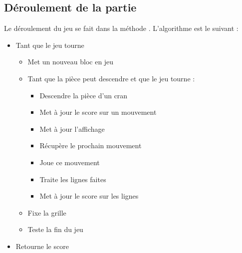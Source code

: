 \subsection{Déroulement de la partie}
Le déroulement du jeu se fait dans la méthode . L'algorithme est le suivant :
\begin{itemize}
	\item Tant que le jeu tourne 
	\begin{itemize}
		\item Met un nouveau bloc en jeu
		\item Tant que la pièce peut descendre et que le jeu tourne :
		\begin{itemize}
			\item Descendre la pièce d'un cran
			\item Met à jour le score sur un mouvement
			\item Met à jour l'affichage
			\item Récupère le prochain mouvement
			\item Joue ce mouvement
			\item Traite les lignes faites
			\item Met à jour le score sur les lignes
		\end{itemize}
		\item 	Fixe la grille
		\item Teste la fin du jeu
	\end{itemize}
	\item Retourne le score
\end{itemize}

